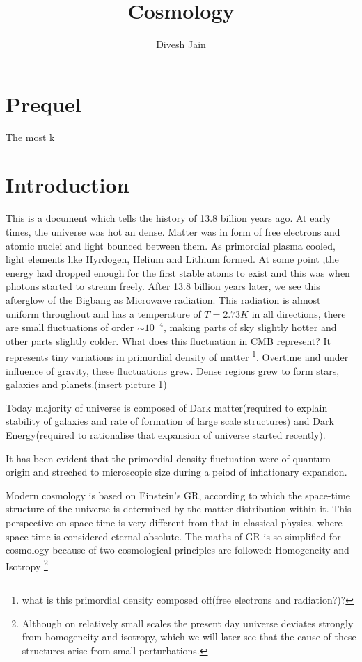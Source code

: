 \documentclass[12pt]{report}
\newcommand{\fn}[1]{\footnote{#1}}
\begin{document}
\title{Cosmology}
\author{Divesh Jain}
\maketitle
\newpage
\tableofcontents
\newpage
\chapter{Prequel}
The most k

\chapter{Introduction}
This is a document which tells the history of 13.8 billion years ago. At early times, the universe was hot an dense. Matter was in form of free electrons and atomic nuclei and light bounced between them. As primordial plasma cooled, light elements like Hyrdogen, Helium and Lithium formed. At some point ,the energy had dropped enough for the first stable atoms to exist and this was when photons started to stream freely. After 13.8 billion years later, we see this afterglow of the Bigbang as Microwave radiation. This radiation is almost uniform throughout and has a temperature of $T=2.73K$ in all directions, there are small fluctuations of order $\sim10^{-4}$, making parts of sky slightly hotter and other parts slightly colder.
What does this fluctuation in CMB represent?
It represents tiny variations in primordial density of matter \footnote{what is this primordial density composed off(free electrons and radiation?)?}. Overtime and under influence of gravity, these fluctuations grew. Dense regions grew to form stars, galaxies and planets.(insert picture 1)

Today majority of universe is composed of Dark matter(required to explain stability of galaxies and rate of formation of large scale structures) and Dark Energy(required to rationalise that expansion of universe started recently). 

It has been evident that the primordial density fluctuation were of quantum origin and streched to microscopic size during a peiod of inflationary expansion. 

Modern cosmology is based on Einstein's GR, according to which the space-time structure of the universe is determined by the matter distribution within it. This perspective on space-time is very different from that in classical physics, where space-time is considered eternal absolute. The maths of GR is so simplified for cosmology because of two cosmological principles are followed: Homogeneity and Isotropy \fn{Although on relatively small scales the present day universe deviates strongly from homogeneity and isotropy, which we will later see that the cause of these structures arise from small perturbations.}
\end{document}
